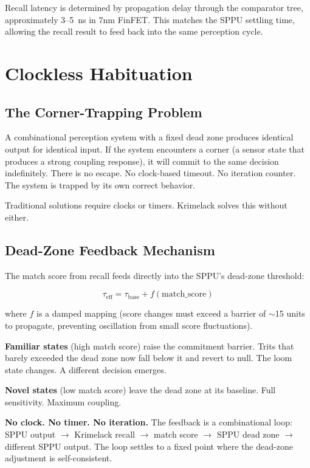 \documentclass[11pt, a4paper]{article}
\begin{document}
Recall latency is determined by propagation delay through the
comparator tree, approximately 3--5~ns in 7nm FinFET. This
matches the SPPU settling time, allowing the recall result to
feed back into the same perception cycle.

\section{Clockless Habituation}

\subsection{The Corner-Trapping Problem}

A combinational perception system with a fixed dead zone
produces identical output for identical input. If the system
encounters a corner (a sensor state that produces a strong
coupling response), it will commit to the same decision
indefinitely. There is no escape. No clock-based timeout.
No iteration counter. The system is trapped by its own
correct behavior.

Traditional solutions require clocks or timers. Krimelack
solves this without either.

\subsection{Dead-Zone Feedback Mechanism}

The match score from recall feeds directly into the SPPU's
dead-zone threshold:

\begin{equation}
  \boxed{
  \tau_{\text{eff}} = \tau_{\text{base}} + f(\text{match\_score})
  }
\end{equation}

where $f$ is a damped mapping (score changes must exceed a
barrier of $\sim$15 units to propagate, preventing oscillation
from small score fluctuations).

\textbf{Familiar states} (high match score) raise the
commitment barrier. Trits that barely exceeded the dead zone
now fall below it and revert to null. The loom state changes.
A different decision emerges.

\textbf{Novel states} (low match score) leave the dead zone
at its baseline. Full sensitivity. Maximum coupling.

\textbf{No clock. No timer. No iteration.} The feedback is a
combinational loop: SPPU output $\to$ Krimelack recall $\to$
match score $\to$ SPPU dead zone $\to$ different SPPU output.
The loop settles to a fixed point where the dead-zone
adjustment is self-consistent.
\end{document}
